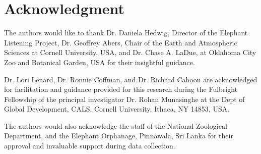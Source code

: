 \documentclass[applsci,article,accept,moreauthors,pdftex]{Definitions/mdpi}
\begin{document}
\section*{Acknowledgment}
The authors would like to thank Dr. Daniela Hedwig, Director of the Elephant Listening Project, Dr. Geoffrey Abers, Chair of the Earth and Atmospheric Sciences at Cornell University, USA, and Dr. Chase A. LaDue, at Oklahoma City Zoo and Botanical Garden, USA for their insightful guidance.\par
Dr. Lori Lenard, Dr. Ronnie Coffman, and Dr. Richard Cahoon are acknowledged for facilitation and guidance provided for this research during the Fulbright Fellowship of the principal investigator Dr. Rohan Munasinghe at the Dept of Global Development, CALS, Cornell University, Ithaca, NY 14853, USA.\par
The authors would also acknowledge the staff of the National Zoological Department, and the Elephant Orphanage, Pinnawala, Sri Lanka for their approval and invaluable support during data collection.
			
\end{document}
